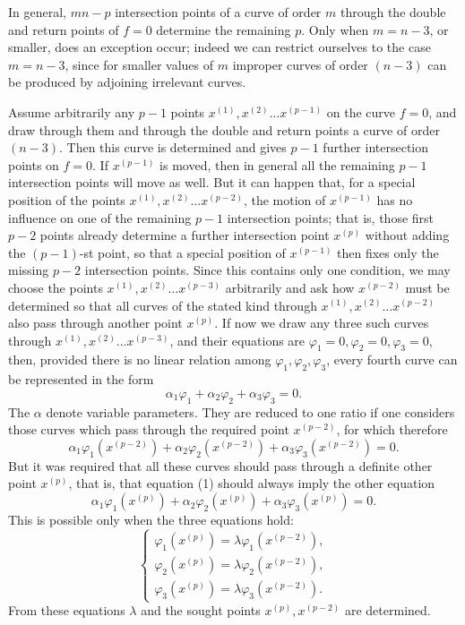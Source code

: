\documentclass[10pt]{article}
\begin{document}
In general, \(mn-p\) intersection points of a curve of order \(m\) through the double and return points of \(f=0\) determine the remaining \(p\). Only when \(m=n-3\), or smaller, does an exception occur; indeed we can restrict ourselves to the case \(m=n-3\), since for smaller values of \(m\) improper curves of order \((n-3)\) can be produced by adjoining irrelevant curves.

Assume arbitrarily any \(p-1\) points \(x^{(1)},x^{(2)}\ldots x^{(p-1)}\) on the curve \(f=0\), and draw through them and through the double and return points a curve of order \((n-3)\). Then this curve is determined and gives \(p-1\) further intersection points on \(f=0\). If \(x^{(p-1)}\) is moved, then in general all the remaining \(p-1\) intersection points will move as well. But it can happen that, for a special position of the points \(x^{(1)},x^{(2)}\ldots x^{(p-2)}\), the motion of \(x^{(p-1)}\) has no influence on one of the remaining \(p-1\) intersection points; that is, those first \(p-2\) points already determine a further intersection point \(x^{(p)}\) without adding the \((p-1)\)-st point, so that a special position of \(x^{(p-1)}\) then fixes only the missing \(p-2\) intersection points. Since this contains only one condition, we may choose the points \(x^{(1)},x^{(2)}\ldots x^{(p-3)}\) arbitrarily and ask how \(x^{(p-2)}\) must be determined so that all curves of the stated kind through \(x^{(1)},x^{(2)}\ldots x^{(p-2)}\) also pass through another point \(x^{(p)}\). If now we draw any three such curves through \(x^{(1)},x^{(2)}\ldots x^{(p-3)}\), and their equations are \(\varphi_1=0,\varphi_2=0,\varphi_3=0\), then, provided there is no linear relation among \(\varphi_1,\varphi_2,\varphi_3\), every fourth curve can be represented in the form
\[
\alpha_1\varphi_1+\alpha_2\varphi_2+\alpha_3\varphi_3=0.
\]
The \(\alpha\) denote variable parameters. They are reduced to one ratio if one considers those curves which pass through the required point \(x^{(p-2)}\), for which therefore
\[
\tag{1}
\alpha_1\varphi_1(x^{(p-2)})+\alpha_2\varphi_2(x^{(p-2)})+\alpha_3\varphi_3(x^{(p-2)})=0.
\]
But it was required that all these curves should pass through a definite other point \(x^{(p)}\), that is, that equation (1) should always imply the other equation
\[
\tag{2}
\alpha_1\varphi_1(x^{(p)})+\alpha_2\varphi_2(x^{(p)})+\alpha_3\varphi_3(x^{(p)})=0.
\]
This is possible only when the three equations hold:
\[
\tag{3}
\begin{cases}
\varphi_1(x^{(p)})=\lambda\varphi_1(x^{(p-2)}),\\
\varphi_2(x^{(p)})=\lambda\varphi_2(x^{(p-2)}),\\
\varphi_3(x^{(p)})=\lambda\varphi_3(x^{(p-2)}).
\end{cases}
\]
From these equations \(\lambda\) and the sought points \(x^{(p)},x^{(p-2)}\) are determined.
\end{document}
